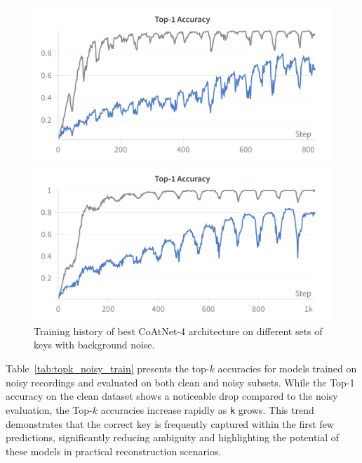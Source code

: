 \documentclass[a4paper,11pt,twoside]{report}
\theoremstyle{definition}
\begin{document}
\begin{figure}[h!]
  \centering
  \begin{minipage}{0.49\linewidth}
      \centering
      \includegraphics[width=\linewidth]{img_results/acc_noisy_alphanum.png}
  \end{minipage}
  \hfill
  \begin{minipage}{0.49\linewidth}
      \centering
      \includegraphics[width=\linewidth]{img_results/acc_noisy_all.png}
  \end{minipage}
  \caption{Training history of best CoAtNet-4 architecture on different sets of keys with background noise.}
  \label{fig:acc_noisy}
\end{figure}

Table~\ref{tab:topk_noisy_train} presents the top-$k$ accuracies for models trained on noisy recordings and evaluated on both clean and noisy subsets. While the Top-1 accuracy on the clean dataset shows a noticeable drop compared to the noisy evaluation, the Top-$k$ accuracies increase rapidly as \texttt{k} grows. This trend demonstrates that the correct key is frequently captured within the first few predictions, significantly reducing ambiguity and highlighting the potential of these models in practical reconstruction scenarios.
\end{document}
